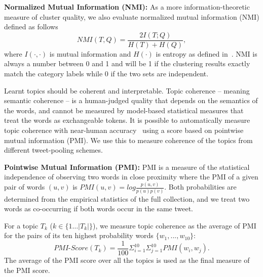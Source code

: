 \documentclass{sig-alternate}
\begin{document}
\vspace{1mm} \noindent \textbf{Normalized Mutual Information (NMI):} As a more
information-theoretic measure of cluster quality, we also evaluate
normalized mutual information (NMI) defined as follows
\[
\mathit{NMI}(T,Q) = \frac{2 I(T;Q)}{H(T) + H(Q)}, 
\]
where $I(\cdot,\cdot)$ is mutual information and $H(\cdot)$ is entropy
as defined in~\cite{MRS08}.
NMI is always a number between 0 and 1 and will be 1 if the clustering
results exactly match the category labels while 0 if the two sets are
independent.

Learnt topics should be coherent and interpretable.  Topic coherence 
-- meaning semantic coherence -- is a human-judged quality that depends on
the semantics of the words, and cannot be measured by model-based
statistical measures that treat the words as exchangeable tokens.  It
is possible to automatically measure topic coherence with near-human
accuracy~\cite{baldwin10} using a score based on pointwise mutual
information (PMI).  We use this to measure coherence of the topics
from different tweet-pooling schemes.

\vspace{1mm} \noindent \textbf{Pointwise Mutual Information (PMI):} PMI is a
measure of the statistical independence of observing two words in
close proximity where the PMI of a given pair of words $(u,v)$ is $PMI
(u,v) = log \frac{p(u,v)}{p(u)p(v)}$.  Both probabilities are
determined from the empirical statistics of the full collection, and
we treat two words as co-occurring if both words occur in the same
tweet.

For a topic $T_k$ ($k \in \{ 1 \ldots |T_k| \}$), we measure topic
coherence as the average of PMI for the pairs of its ten highest
probability words $\{w_1,...,w_{10}\}$:
\begin{equation*}
	\mathit{PMI}\text{-}\mathit{Score}(T_k) = \frac{1}{100} \Sigma_{i=1}^{10} \Sigma_{j=1}^{10} PMI(w_i,w_j) .
\end{equation*}
The average of the PMI score over all the topics is used as the final
measure of the PMI score.
\end{document}
